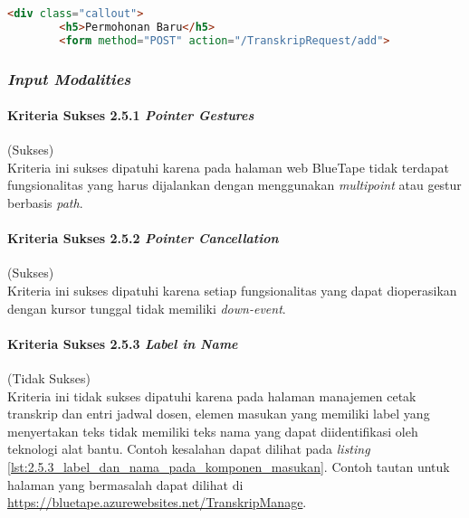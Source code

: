 \begin{lstlisting}[frame=single, label={lst:2.4.10_heading_tidak_tepat}, language=HTML, caption=Pelanggaran Kriteria Sukses 2.4.10 pada Halaman Cetak Transkrip]
    <div class="callout">
        <h5>Permohonan Baru</h5>
        <form method="POST" action="/TranskripRequest/add">
\end{lstlisting}

\subsubsection{\textit{Input Modalities}}
\label{subsubsec:kepatuhan_bluetape_input_modalities}

\paragraph{Kriteria Sukses 2.5.1 \textit{Pointer Gestures}}
\label{par:kepatuhan_bluetape_kriteria_sukses_2.5.1}
(Sukses)\\

Kriteria ini sukses dipatuhi karena pada halaman web BlueTape tidak terdapat fungsionalitas yang harus dijalankan dengan menggunakan \textit{multipoint} atau gestur berbasis \textit{path}.

\paragraph{Kriteria Sukses 2.5.2 \textit{Pointer Cancellation}}
\label{par:kepatuhan_bluetape_kriteria_sukses_2.5.2}
(Sukses)\\

Kriteria ini sukses dipatuhi karena setiap fungsionalitas yang dapat dioperasikan dengan kursor tunggal tidak memiliki \textit{down-event}.

\paragraph{Kriteria Sukses 2.5.3 \textit{Label in Name}}
\label{par:kepatuhan_bluetape_kriteria_sukses_2.5.3}
(Tidak Sukses)\\

Kriteria ini tidak sukses dipatuhi karena pada halaman manajemen cetak transkrip dan entri jadwal dosen, elemen masukan yang memiliki label yang menyertakan teks tidak memiliki teks nama yang dapat diidentifikasi oleh teknologi alat bantu. Contoh kesalahan dapat dilihat pada \textit{listing} \ref{lst:2.5.3_label_dan_nama_pada_komponen_masukan}. Contoh tautan untuk halaman yang bermasalah dapat dilihat di \url{https://bluetape.azurewebsites.net/TranskripManage}.

